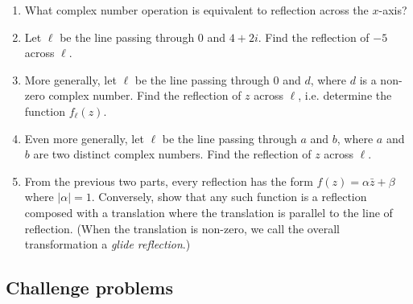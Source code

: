 \begin{enumerate}
\begin{enumerate}
\item What complex number operation is equivalent to reflection across the $x$-axis?
\item Let $\ell$ be the line passing through $0$ and $4 + 2i$. Find the reflection of $-5$ across $\ell$.
\item More generally, let $\ell$ be the line passing through $0$ and $d$, where $d$ is a non-zero complex number. Find the reflection of $z$ across $\ell$, i.e. determine the function $f_{\ell}(z)$.
\item Even more generally, let $\ell$ be the line passing through $a$ and $b$, where $a$ and $b$ are two distinct complex numbers. Find the reflection of $z$ across $\ell$.
\item From the previous two parts, every reflection has the form $f(z) = \alpha\bar{z} + \beta$ where $\lvert\alpha\rvert = 1$. Conversely, show that any such function is a reflection composed with a translation where the translation is parallel to the line of reflection. (When the translation is non-zero, we call the overall transformation a \emph{glide reflection}.)
\end{enumerate}
\end{enumerate}


\subsection{Challenge problems}

